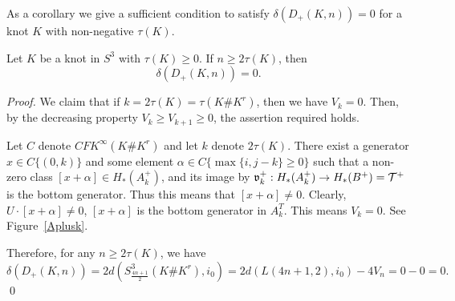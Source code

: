 \documentclass[11pt]{amsart}
\begin{document}
As a corollary we give a sufficient condition to satisfy $\delta(D_+(K,n))=0$ for a knot $K$ with non-negative $\tau(K)$.
\begin{cor}
\label{deltazerocor}
Let $K$ be a knot in $S^3$ with $\tau(K)\ge 0$.
If $n\ge 2\tau(K)$, then 
$$\delta(D_+(K,n))=0.$$
\end{cor}
\begin{proof}
We claim that if $k=2\tau(K)=\tau(K\#K^r)$, then we have $V_k=0$.
Then, by the decreasing property $V_k\ge V_{k+1}\ge 0$, the assertion required holds.

Let $C$ denote $CFK^\infty(K\#K^r)$ and let $k$ denote $2\tau(K)$.
There exist a generator $x\in C\{(0,k)\}$ and some element $\alpha\in C\{\max\{i,j- k\}\ge 0\}$ such that
a non-zero class $[x+\alpha]\in H_\ast(A_k^+)$, and its image by $\frak{v}_k^+:H_\ast(A_k^+)\to H_\ast(B^+)={\mathcal T}^+$ is the bottom generator.
Thus this means that $[x+\alpha]\neq 0$.
Clearly, $U\cdot [x+\alpha]\neq 0$, $[x+\alpha]$ is the bottom generator in $A^T_k$.
This means $V_k=0$.
See {\sc Figure}~\ref{Aplusk}.

Therefore, for any $n\ge 2\tau(K)$, we have
$$\delta(D_+(K,n))=2d(S^3_\frac{4n+1}{2}(K\#K^r),i_0)=2d(L(4n+1,2),i_0)-4V_{n}=0-0=0.$$
\qed\end{proof}
\end{document}
